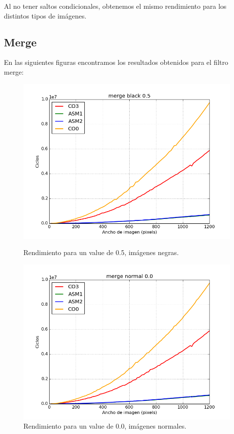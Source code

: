\documentclass[a4paper]{article}
\begin{document}
Al no tener saltos condicionales, obtenemos el mismo rendimiento para los distintos tipos de imágenes. 


\subsection{Merge}

En las siguientes figuras encontramos los resultados obtenidos para el filtro merge:

\begin{figure}[H]
	\begin{center}
		\includegraphics[scale=0.4]{../tp2-bundle.v2/Testing/plots/all/merge-black-05--all.png}
		\caption{Rendimiento para un value de 0.5, imágenes negras.}
		\label{fig:exp1-5}
	\end{center}
	\endminipage\hfill
	\begin{center}
		\includegraphics[scale=0.4]{../tp2-bundle.v2/Testing/plots/all/merge-normal-00--all.png}
		\caption{Rendimiento para un value de 0.0, imágenes normales.}
		\label{fig:exp1-2}
	\end{center}
	\endminipage\hfill
\end{figure}
\end{document}
